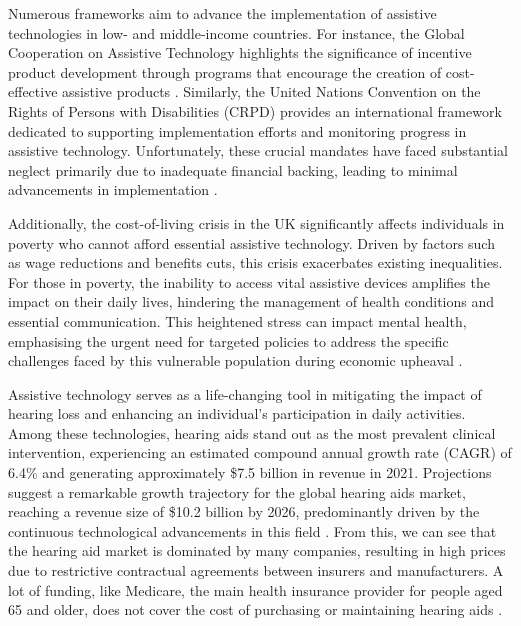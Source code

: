 \documentclass{l4proj}
\begin{document}
Numerous frameworks aim to advance the implementation of assistive technologies in low- and middle-income countries. For instance, the Global Cooperation on Assistive Technology highlights the significance of incentive product development through programs that encourage the creation of cost-effective assistive products \citep{Tangcharoensathien2018-le}. Similarly, the United Nations Convention on the Rights of Persons with Disabilities (CRPD) \citep{United_Nations} provides an international framework dedicated to supporting implementation efforts and monitoring progress in assistive technology. Unfortunately, these crucial mandates have faced substantial neglect primarily due to inadequate financial backing, leading to minimal advancements in implementation \citep{00006479-201135010-00003}.

Additionally, the cost-of-living crisis in the UK significantly affects individuals in poverty who cannot afford essential assistive technology. Driven by factors such as wage reductions and benefits cuts, this crisis exacerbates existing inequalities. For those in poverty, the inability to access vital assistive devices amplifies the impact on their daily lives, hindering the management of health conditions and essential communication. This heightened stress can impact mental health, emphasising the urgent need for targeted policies to address the specific challenges faced by this vulnerable population during economic upheaval \citep{broadbent2023public}.

Assistive technology serves as a life-changing tool in mitigating the impact of hearing loss and enhancing an individual's participation in daily activities. Among these technologies, hearing aids stand out as the most prevalent clinical intervention, experiencing an estimated compound annual growth rate (CAGR) of 6.4\% and generating approximately \$7.5 billion in revenue in 2021. Projections suggest a remarkable growth trajectory for the global hearing aids market, reaching a revenue size of \$10.2 billion by 2026, predominantly driven by the continuous technological advancements in this field \citep{Market_Research_Firm}. From this, we can see that the hearing aid market is dominated by many companies, resulting in high prices due to restrictive contractual agreements between insurers and manufacturers. A lot of funding, like Medicare, the main health insurance provider for people aged 65 and older, does not cover the cost of purchasing or maintaining hearing aids \citep{10.1001/jamaoto.2018.0273}.
\end{document}
